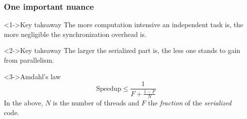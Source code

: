\documentclass[xcolor={dvipsnames,svgnames},aspectratio=169]{beamer}
\begin{document}
\begin{frame}[fragile]
  \frametitle{One important nuance}

  \begin{block}<1->{\faLightbulb \quad Key takeaway}
    The more computation intensive an independent task is, the more negligible
    the synchronization overhead is.
  \end{block}

  \vspace{0.4cm}

  \begin{block}<2->{\faLightbulb \quad Key takeaway}
    The larger the serialized part is, the less one stands to gain from parallelism.
  \end{block}

  \vspace{0.4cm}

  \begin{block}<3->{\faLightbulb \quad Amdahl's law}
    \[
      \mathrm{Speedup} \leq \frac{1}{F + \frac{1-F}{N}}
    \]
    In the above, $N$ is the number of threads and $F$ the \emph{fraction} of
    the \emph{serialized} code.
  \end{block}
\end{frame}




\end{document}
